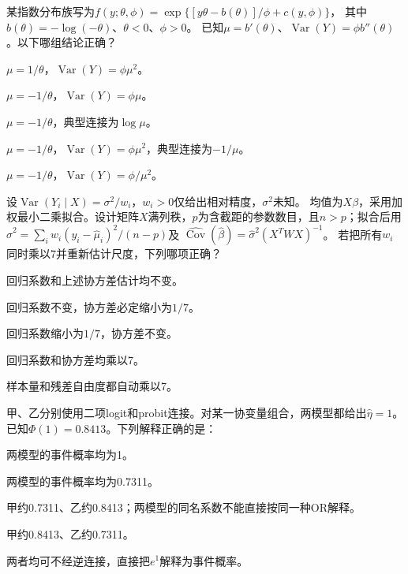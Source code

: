 \par\noindent\begin{minipage}{\linewidth}
某指数分布族写为$f(y;\theta,\phi)=\exp\{[y\theta-b(\theta)]/\phi+c(y,\phi)\}$，
其中$b(\theta)=-\log(-\theta)$、$\theta<0$、$\phi>0$。
已知$\mu=b'(\theta)$、$\operatorname{Var}(Y)=\phi b''(\theta)$。以下哪组结论正确？
\begin{choices}
\item $\mu=1/\theta$，$\operatorname{Var}(Y)=\phi\mu^2$。
\item $\mu=-1/\theta$，$\operatorname{Var}(Y)=\phi\mu$。
\item $\mu=-1/\theta$，典型连接为$\log\mu$。
\item $\mu=-1/\theta$，$\operatorname{Var}(Y)=\phi\mu^2$，典型连接为$-1/\mu$。
\item $\mu=-1/\theta$，$\operatorname{Var}(Y)=\phi/\mu^2$。
\end{choices}
\end{minipage}\par\medskip

\par\noindent\begin{minipage}{\linewidth}
设$\operatorname{Var}(Y_i\mid X)=\sigma^2/w_i$，$w_i>0$仅给出相对精度，$\sigma^2$未知。
均值为$X\beta$，采用加权最小二乘拟合。设计矩阵$X$满列秩，$p$为含截距的参数数目，且$n>p$；拟合后用
$\hat\sigma^2=\sum_iw_i(y_i-\hat\mu_i)^2/(n-p)$及
$\widehat{\operatorname{Cov}}(\hat\beta)=\hat\sigma^2(X^TWX)^{-1}$。
若把所有$w_i$同时乘以7并重新估计尺度，下列哪项正确？
\begin{choices}
\item 回归系数和上述协方差估计均不变。
\item 回归系数不变，协方差必定缩小为$1/7$。
\item 回归系数缩小为$1/7$，协方差不变。
\item 回归系数和协方差均乘以7。
\item 样本量和残差自由度都自动乘以7。
\end{choices}
\end{minipage}\par\medskip

\par\noindent\begin{minipage}{\linewidth}
甲、乙分别使用二项logit和probit连接。对某一协变量组合，两模型都给出$\hat\eta=1$。
已知$\Phi(1)=0.8413$。下列解释正确的是：
\begin{choices}
\item 两模型的事件概率均为1。
\item 两模型的事件概率均为0.7311。
\item 甲约0.7311、乙约0.8413；两模型的同名系数不能直接按同一种OR解释。
\item 甲约0.8413、乙约0.7311。
\item 两者均可不经逆连接，直接把$e^1$解释为事件概率。
\end{choices}
\end{minipage}\par\medskip

